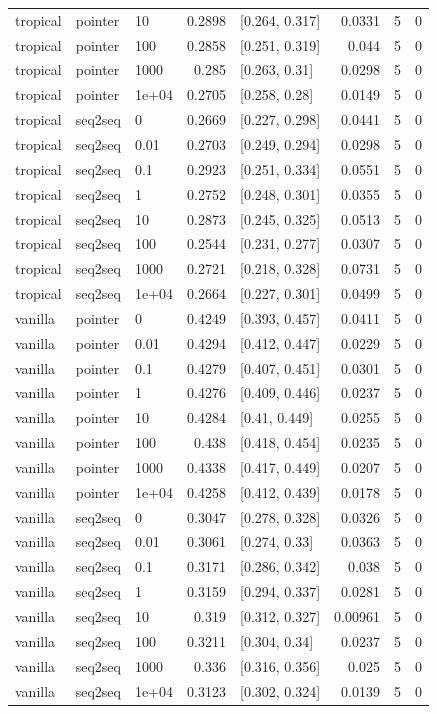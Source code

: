 \documentclass[10pt]{article}
\begin{document}
{\begin{longtable}{lllrlrrr}
tropical & pointer & 10 & 0.2898 & [0.264, 0.317] & 0.0331 & 5 & 0\\
tropical & pointer & 100 & 0.2858 & [0.251, 0.319] & 0.044 & 5 & 0\\
tropical & pointer & 1000 & 0.285 & [0.263, 0.31] & 0.0298 & 5 & 0\\
tropical & pointer & 1e+04 & 0.2705 & [0.258, 0.28] & 0.0149 & 5 & 0\\
tropical & seq2seq & 0 & 0.2669 & [0.227, 0.298] & 0.0441 & 5 & 0\\
tropical & seq2seq & 0.01 & 0.2703 & [0.249, 0.294] & 0.0298 & 5 & 0\\
tropical & seq2seq & 0.1 & 0.2923 & [0.251, 0.334] & 0.0551 & 5 & 0\\
tropical & seq2seq & 1 & 0.2752 & [0.248, 0.301] & 0.0355 & 5 & 0\\
tropical & seq2seq & 10 & 0.2873 & [0.245, 0.325] & 0.0513 & 5 & 0\\
tropical & seq2seq & 100 & 0.2544 & [0.231, 0.277] & 0.0307 & 5 & 0\\
tropical & seq2seq & 1000 & 0.2721 & [0.218, 0.328] & 0.0731 & 5 & 0\\
tropical & seq2seq & 1e+04 & 0.2664 & [0.227, 0.301] & 0.0499 & 5 & 0\\
vanilla & pointer & 0 & 0.4249 & [0.393, 0.457] & 0.0411 & 5 & 0\\
vanilla & pointer & 0.01 & 0.4294 & [0.412, 0.447] & 0.0229 & 5 & 0\\
vanilla & pointer & 0.1 & 0.4279 & [0.407, 0.451] & 0.0301 & 5 & 0\\
vanilla & pointer & 1 & 0.4276 & [0.409, 0.446] & 0.0237 & 5 & 0\\
vanilla & pointer & 10 & 0.4284 & [0.41, 0.449] & 0.0255 & 5 & 0\\
vanilla & pointer & 100 & 0.438 & [0.418, 0.454] & 0.0235 & 5 & 0\\
vanilla & pointer & 1000 & 0.4338 & [0.417, 0.449] & 0.0207 & 5 & 0\\
vanilla & pointer & 1e+04 & 0.4258 & [0.412, 0.439] & 0.0178 & 5 & 0\\
vanilla & seq2seq & 0 & 0.3047 & [0.278, 0.328] & 0.0326 & 5 & 0\\
vanilla & seq2seq & 0.01 & 0.3061 & [0.274, 0.33] & 0.0363 & 5 & 0\\
vanilla & seq2seq & 0.1 & 0.3171 & [0.286, 0.342] & 0.038 & 5 & 0\\
vanilla & seq2seq & 1 & 0.3159 & [0.294, 0.337] & 0.0281 & 5 & 0\\
vanilla & seq2seq & 10 & 0.319 & [0.312, 0.327] & 0.00961 & 5 & 0\\
vanilla & seq2seq & 100 & 0.3211 & [0.304, 0.34] & 0.0237 & 5 & 0\\
vanilla & seq2seq & 1000 & 0.336 & [0.316, 0.356] & 0.025 & 5 & 0\\
vanilla & seq2seq & 1e+04 & 0.3123 & [0.302, 0.324] & 0.0139 & 5 & 0\\
\bottomrule
\end{longtable}
}
\end{document}

